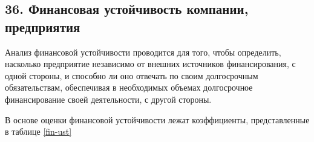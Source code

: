 \subsection*{36. Финансовая устойчивость компании, предприятия}

Анализ финансовой устойчивости проводится для того, чтобы определить, насколько предприятие независимо от внешних источников финансирования, с одной стороны, и способно ли оно отвечать по своим долгосрочным обязательствам, обеспечивая в необходимых объемах долгосрочное финансирование своей деятельности, с другой стороны.

В основе оценки финансовой устойчивости лежат коэффициенты, представленные в таблице \ref{fin-ust}

\begingroup
\setlength{\extrarowheight}{0.2cm}
	\small
